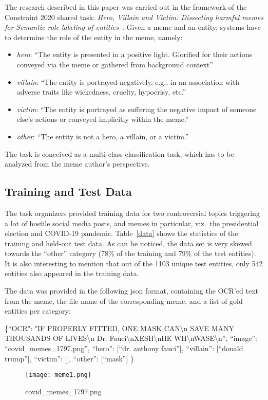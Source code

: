 \documentclass[11pt]{article}
\begin{document}
The research described in this paper was carried out in the framework of the Constraint 2020 shared task: \emph{Hero, Villain and Victim: Dissecting harmful memes for Semantic role labeling of entities}~\cite{Sharma2022}.
Given a meme and an entity, systems have to determine the role of the entity in the meme, namely:
\begin{itemize}
    \item \emph{hero}: ``The entity is presented in a positive light. Glorified for their actions conveyed via the meme or gathered from background context''
    \item \emph{villain}: ``The entity is portrayed negatively, e.g., in an association with adverse traits like wickedness, cruelty, hypocrisy, etc.''
    \item \emph{victim}: ``The entity is portrayed as suffering the negative impact of someone else’s actions or conveyed implicitly within the meme.''
    \item \emph{other}: ``The entity is not a hero, a villain, or a victim.''
\end{itemize}

The task is conceived as a multi-class classification task, which has to be analyzed from the meme author's perspective.

\subsection{Training and Test Data}

The task organizers provided training data for two controversial topics triggering a lot of hostile social media posts, and memes in particular, viz.~the presidential election and COVID-19 pandemic. Table~\ref{data} shows the statistics of the training and held-out test data. As can be noticed, the data set is very skewed towards the ``other'' category (78\% of the training and 79\% of the test entities). It is also interesting to mention that out of the 1103 unique test entities, only 542 entities also appeared in the training data.


The data was provided in the following json format, containing the OCR'ed text from the meme, the file name of the corresponding meme, and a list of gold entities per category:\\

\begin{small}
\noindent\{``OCR": "IF PROPERLY FITTED, ONE MASK CAN\textbackslash n SAVE MANY THOUSANDS OF LIVES\textbackslash n Dr. Fauci\textbackslash nXESH\textbackslash nHE WH\textbackslash nWASE\textbackslash n'', ``image'': ``covid\_memes\_1797.png'', ``hero'': [``dr. anthony fauci''], ``villain'': [``donald trump''], ``victim'': [], ``other'': [``mask'']
\}

\begin{figure}[h]
    \centering
    \texttt{[image: meme1.png]}
    \caption{covid\_memes\_1797.png}
    \label{fig1}
\end{figure}


\end{small}
\end{document}

